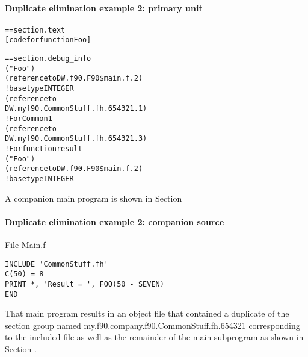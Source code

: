 \paragraph{Duplicate elimination example 2: primary unit }
\label{app:duplicateeliminationexample2primaryunit}
\begin{alltt}
== section .text
    [code for function Foo]

== section .debug\_info
            ("Foo")
            (reference to DW.f90.F90\$main.f.2)
                ! base type INTEGER
                (reference to
                    DW.myf90.CommonStuff.fh.654321.1)
             ! For Common1
                (reference to
                    DW.myf90.CommonStuff.fh.654321.3)
             ! For function result
                ("Foo")
                    (reference to DW.f90.F90\$main.f.2)
                        ! base type INTEGER
\end{alltt}

A companion main program is shown in 
Section 

\paragraph{Duplicate elimination example 2: companion source }
\label{app:duplicateeliminationexample2companionsource}

File Main.f 

\begin{lstlisting}
INCLUDE 'CommonStuff.fh'
C(50) = 8
PRINT *, 'Result = ', FOO(50 - SEVEN)
END
\end{lstlisting}

That main program results in an object file that
contained a duplicate of the section group named
my.f90.company.f90.CommonStuff.fh.654321 
corresponding to the
included file as well as the remainder of the main subprogram
as shown in 
Section .

